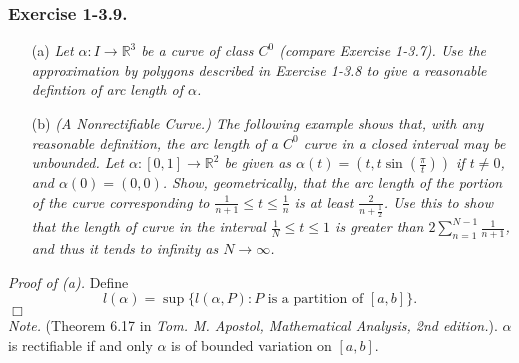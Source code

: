 \documentclass{article}
\begin{document}



\subsubsection*{Exercise 1-3.9.}
\begin{enumerate}
\item[(a)]
  \emph{Let $\alpha: I \to \mathbb{R}^3$ be a curve of class $C^{0}$
  (compare Exercise 1-3.7).
  Use the approximation by polygons described in Exercise 1-3.8 to give
  a reasonable defintion of arc length of $\alpha$.}

\item[(b)]
  \emph{(A Nonrectifiable Curve.)
  The following example shows that, with any reasonable definition,
  the arc length of a $C^{0}$ curve in a closed interval may be unbounded.
  Let $\alpha:[0,1] \to \mathbb{R}^2$ be given as
  $\alpha(t) = (t, t \sin(\frac{\pi}{t}))$ if $t \neq 0$,
  and $\alpha(0) = (0,0)$.
  Show, geometrically, that the arc length of the portion of the curve corresponding to
  $\frac{1}{n+1} \leq t \leq \frac{1}{n}$ is at least $\frac{2}{n + \frac{1}{2}}$.
  Use this to show that the length of curve in the interval $\frac{1}{N} \leq t \leq 1$
  is greater than $2 \sum_{n=1}^{N-1} \frac{1}{n+1}$,
  and thus it tends to infinity as $N \to \infty$.} \\
\end{enumerate}



\emph{Proof of (a).}
Define
\[
  l(\alpha) = \sup \{ l(\alpha,P) : P \text{ is a partition of } [a,b] \}.
\]
$\Box$ \\

\emph{Note.}
(Theorem 6.17 in \emph{Tom. M. Apostol, Mathematical Analysis, 2nd edition.}).
$\alpha$ is rectifiable if and only $\alpha$ is of bounded variation on $[a,b]$. \\
\end{document}
